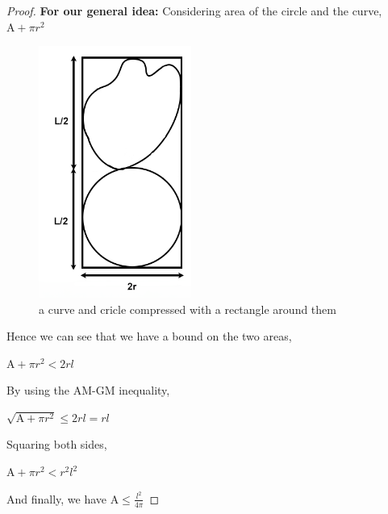 \documentclass[a4paper]{book}
\numberwithin{theorem}{section}%
\begin{document}
\begin{proof}
    \newpage
    \textbf{For our general idea:} Considering area of the circle and the curve, $\displaystyle \mathrm{A}+\pi r^{2}$
    \begin{figure}[hbt!]
        \begin{center}   
            \includegraphics[width=50mm]{esfigure2}
            \caption{a curve and cricle compressed with a rectangle around them}
        \end{center}
    \end{figure}\leavevmode
    \newline
    Hence we can see that we have a bound on the two areas,
    \begin{center}
        $\displaystyle \mathrm{A}+\pi r^{2}<2rl$
    \end{center}
    By using the AM-GM inequality,
    \begin{center}
        $\displaystyle \sqrt{\mathrm{A}+\pi r^{2}}\leq2rl=rl$
    \end{center}
    Squaring both sides,
    \begin{center}
        $\displaystyle \mathrm{A}+\pi r^{2}<r^{2}l^{2}$
    \end{center}
    And finally, we have $\displaystyle \mathrm{A}\leq\frac{l^2}{4\pi}$


\end{proof}
\end{document}
